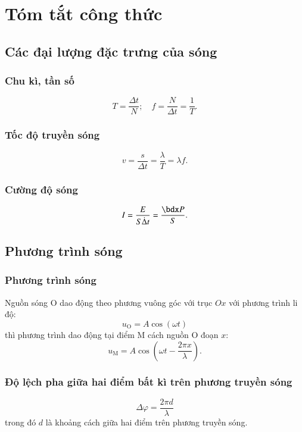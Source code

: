\chapter{Tóm tắt công thức}
\section{Các đại lượng đặc trưng của sóng}
\subsection{Chu kì, tần số}
$$T=\dfrac{\Delta t}{N};\quad f=\dfrac{N}{\Delta t}=\dfrac{1}{T}.$$
\subsection{Tốc độ truyền sóng}
$$v=\dfrac{s}{\Delta t}=\dfrac{\lambda}{T}=\lambda f.$$
\subsection{Cường độ sóng}
$$I=\dfrac{E}{S\dot \Delta t}=\dfrac{\calP}{S}.$$
\section{Phương trình sóng}
\subsection{Phương trình sóng}
Nguồn sóng O dao động theo phương vuông góc với trục $Ox$ với phương trình li độ:
$$u_\text{O}=A\cos\left(\omega t\right)$$
thì phương trình dao động tại điểm M cách nguồn O đoạn $x$:
$$u_\text{M}=A\cos\left(\omega t-\dfrac{2\pi x}{\lambda}\right).$$
\subsection{Độ lệch pha giữa hai điểm bất kì trên phương truyền sóng}
$$\Delta\varphi=\dfrac{2\pi d}{\lambda}$$
trong đó $d$ là khoảng cách giữa hai điểm trên phương truyền sóng.

